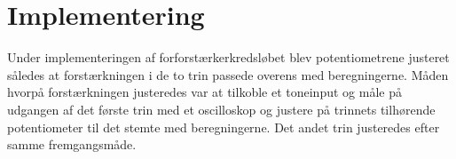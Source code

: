 \section{Implementering}

Under implementeringen af forforstærkerkredsløbet blev potentiometrene justeret således at forstærkningen i de to trin passede overens med beregningerne. Måden hvorpå forstærkningen justeredes var at tilkoble et toneinput og måle på udgangen af det første trin med et oscilloskop og justere på trinnets tilhørende potentiometer til det stemte med beregningerne. Det andet trin justeredes efter samme fremgangsmåde.